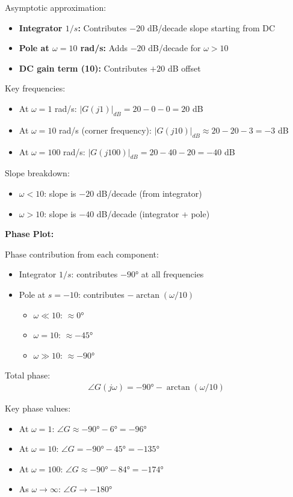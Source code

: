 \documentclass[11pt,a4paper]{article}
\begin{document}
Asymptotic approximation:
\begin{itemize}
  \item \textbf{Integrator $1/s$:} Contributes $-20$ dB/decade slope starting from DC
  \item \textbf{Pole at $\omega = 10$ rad/s:} Adds $-20$ dB/decade for $\omega > 10$
  \item \textbf{DC gain term (10):} Contributes $+20$ dB offset
\end{itemize}

Key frequencies:
\begin{itemize}
  \item At $\omega = 1$ rad/s: $|G(j1)|_{dB} = 20 - 0 - 0 = 20$ dB
  \item At $\omega = 10$ rad/s (corner frequency): $|G(j10)|_{dB} \approx 20 - 20 - 3 = -3$ dB
  \item At $\omega = 100$ rad/s: $|G(j100)|_{dB} = 20 - 40 - 20 = -40$ dB
\end{itemize}

Slope breakdown:
\begin{itemize}
  \item $\omega < 10$: slope is $-20$ dB/decade (from integrator)
  \item $\omega > 10$: slope is $-40$ dB/decade (integrator + pole)
\end{itemize}

\textbf{Phase Plot:}

Phase contribution from each component:
\begin{itemize}
  \item Integrator $1/s$: contributes $-90°$ at all frequencies
  \item Pole at $s = -10$: contributes $-\arctan(\omega/10)$
    \begin{itemize}
      \item $\omega \ll 10$: $\approx 0°$
      \item $\omega = 10$: $\approx -45°$
      \item $\omega \gg 10$: $\approx -90°$
    \end{itemize}
\end{itemize}

Total phase:
\begin{align}
  \angle G(j\omega) = -90° - \arctan(\omega/10)
\end{align}

Key phase values:
\begin{itemize}
  \item At $\omega = 1$: $\angle G \approx -90° - 6° = -96°$
  \item At $\omega = 10$: $\angle G = -90° - 45° = -135°$
  \item At $\omega = 100$: $\angle G \approx -90° - 84° = -174°$
  \item As $\omega \to \infty$: $\angle G \to -180°$
\end{itemize}
\end{document}
